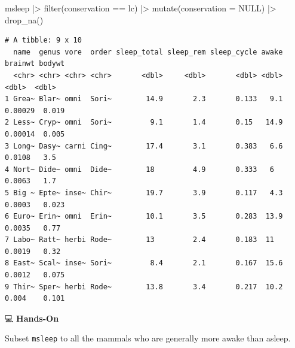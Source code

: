 \documentclass[
  letterpaper,
  DIV=11,
  numbers=noendperiod]{scrreprt}
\newenvironment{Shaded}{\begin{snugshade}}{\end{snugshade}}
\newcommand{\AttributeTok}[1]{\textcolor[rgb]{0.40,0.45,0.13}{#1}}
\newcommand{\ConstantTok}[1]{\textcolor[rgb]{0.56,0.35,0.01}{#1}}
\newcommand{\FunctionTok}[1]{\textcolor[rgb]{0.28,0.35,0.67}{#1}}
\newcommand{\NormalTok}[1]{\textcolor[rgb]{0.00,0.23,0.31}{#1}}
\newcommand{\SpecialCharTok}[1]{\textcolor[rgb]{0.37,0.37,0.37}{#1}}
\newcommand{\StringTok}[1]{\textcolor[rgb]{0.13,0.47,0.30}{#1}}
\begin{document}
\begin{tcolorbox}[enhanced jigsaw, colbacktitle=quarto-callout-tip-color!10!white, opacitybacktitle=0.6, breakable, left=2mm, leftrule=.75mm, toprule=.15mm, toptitle=1mm, bottomtitle=1mm, colframe=quarto-callout-tip-color-frame, opacityback=0, coltitle=black, arc=.35mm, titlerule=0mm, colback=white, bottomrule=.15mm, title=\textcolor{quarto-callout-tip-color}{\faLightbulb}\hspace{0.5em}{Answer}, rightrule=.15mm]

\begin{Shaded}
\begin{Highlighting}[]
\NormalTok{msleep }\SpecialCharTok{|\textgreater{}}
  \FunctionTok{filter}\NormalTok{(conservation }\SpecialCharTok{==} \StringTok{\textquotesingle{}lc\textquotesingle{}}\NormalTok{) }\SpecialCharTok{|\textgreater{}}
  \FunctionTok{mutate}\NormalTok{(}\AttributeTok{conservation =} \ConstantTok{NULL}\NormalTok{) }\SpecialCharTok{|\textgreater{}}
  \FunctionTok{drop\_na}\NormalTok{()}
\end{Highlighting}
\end{Shaded}

\begin{verbatim}
# A tibble: 9 x 10
  name  genus vore  order sleep_total sleep_rem sleep_cycle awake brainwt bodywt
  <chr> <chr> <chr> <chr>       <dbl>     <dbl>       <dbl> <dbl>   <dbl>  <dbl>
1 Grea~ Blar~ omni  Sori~        14.9       2.3       0.133   9.1 0.00029  0.019
2 Less~ Cryp~ omni  Sori~         9.1       1.4       0.15   14.9 0.00014  0.005
3 Long~ Dasy~ carni Cing~        17.4       3.1       0.383   6.6 0.0108   3.5  
4 Nort~ Dide~ omni  Dide~        18         4.9       0.333   6   0.0063   1.7  
5 Big ~ Epte~ inse~ Chir~        19.7       3.9       0.117   4.3 0.0003   0.023
6 Euro~ Erin~ omni  Erin~        10.1       3.5       0.283  13.9 0.0035   0.77 
7 Labo~ Ratt~ herbi Rode~        13         2.4       0.183  11   0.0019   0.32 
8 East~ Scal~ inse~ Sori~         8.4       2.1       0.167  15.6 0.0012   0.075
9 Thir~ Sper~ herbi Rode~        13.8       3.4       0.217  10.2 0.004    0.101
\end{verbatim}

\end{tcolorbox}

💻 \textbf{Hands-On}

Subset \texttt{msleep} to all the mammals who are generally more awake
than asleep.
\end{document}
